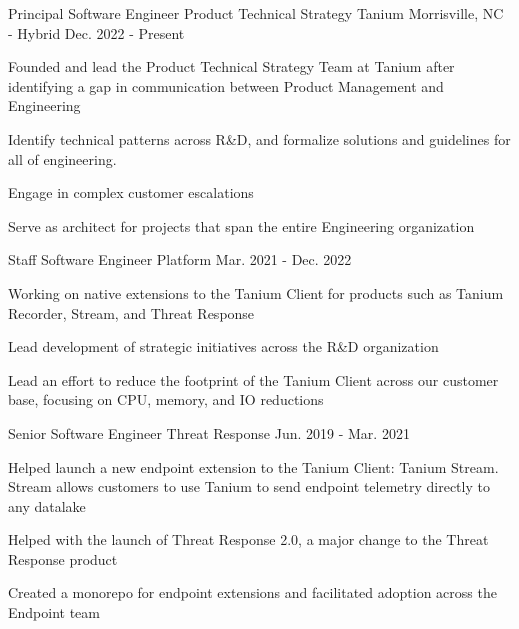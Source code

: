 
  \begin{cventries}

    \cventry
    {Principal Software Engineer {\enskip\textendash\enskip} Product Technical Strategy} %
    {Tanium} %
    {Morrisville, NC - Hybrid} %
    {Dec. 2022 - Present} %
    {
      \begin{cvitems}
        \item Founded and lead the Product Technical Strategy Team at Tanium after identifying a gap in communication between Product Management and Engineering
        \item Identify technical patterns across R\&D, and formalize solutions and guidelines for all of engineering.
        \item Engage in complex customer escalations
        \item Serve as architect for projects that span the entire Engineering organization
      \end{cvitems}
    }

    \cventry
      {Staff Software Engineer \enskip\textendash\enskip Platform} %
      {} %
      {} %
      {Mar. 2021 - Dec. 2022} %
      {
        \begin{cvitems}
          \item Working on native extensions to the Tanium Client for products such as Tanium Recorder, Stream, and Threat Response
          \item Lead development of strategic initiatives across the R\&D organization
          \item Lead an effort to reduce the footprint of the Tanium Client across our customer base, focusing on CPU, memory, and IO reductions
        \end{cvitems}
      }

    \cventry
      {Senior Software Engineer \enskip\textendash\enskip Threat Response} %
      {} %
      {} %
      {Jun. 2019 - Mar. 2021} %
      {
        \begin{cvitems}
          \item Helped launch a new endpoint extension to the Tanium Client: Tanium Stream. Stream allows customers to use Tanium to send endpoint telemetry directly to any datalake
          \item Helped with the launch of Threat Response 2.0, a major change to the Threat Response product
          \item Created a monorepo for endpoint extensions and facilitated adoption across the Endpoint team
        \end{cvitems}
      }


\end{cventries}
